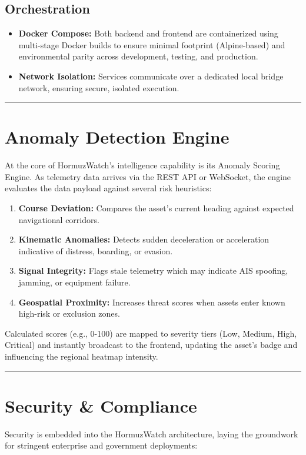 \documentclass[11pt,a4paper]{article}
\begin{document}
\subsection{Orchestration}
\begin{itemize}
    \item \textbf{Docker Compose:} Both backend and frontend are containerized using multi-stage Docker builds to ensure minimal footprint (Alpine-based) and environmental parity across development, testing, and production.
    \item \textbf{Network Isolation:} Services communicate over a dedicated local bridge network, ensuring secure, isolated execution.
\end{itemize}

\noindent\textcolor{textsecondary}{\rule{\textwidth}{0.5pt}}

\section{Anomaly Detection Engine}
At the core of HormuzWatch's intelligence capability is its Anomaly Scoring Engine. As telemetry data arrives via the REST API or WebSocket, the engine evaluates the data payload against several risk heuristics:

\begin{enumerate}[label=\textcolor{textsecondary}{\arabic*.}]
    \item \textbf{Course Deviation:} Compares the asset's current heading against expected navigational corridors.
    \item \textbf{Kinematic Anomalies:} Detects sudden deceleration or acceleration indicative of distress, boarding, or evasion.
    \item \textbf{Signal Integrity:} Flags stale telemetry which may indicate AIS spoofing, jamming, or equipment failure.
    \item \textbf{Geospatial Proximity:} Increases threat scores when assets enter known high-risk or exclusion zones.
\end{enumerate}

Calculated scores (e.g., 0-100) are mapped to severity tiers (Low, Medium, High, Critical) and instantly broadcast to the frontend, updating the asset's badge and influencing the regional heatmap intensity.

\noindent\textcolor{textsecondary}{\rule{\textwidth}{0.5pt}}

\section{Security \& Compliance}
Security is embedded into the HormuzWatch architecture, laying the groundwork for stringent enterprise and government deployments:
\end{document}
